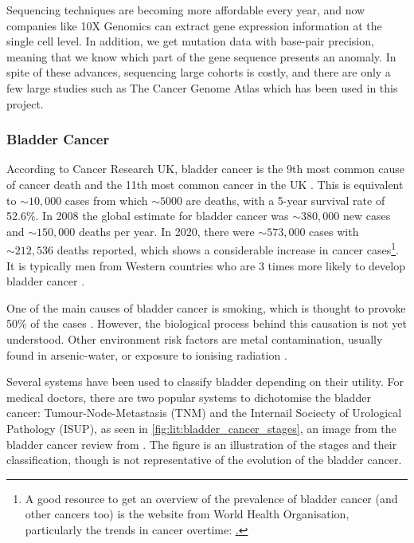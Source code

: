 Sequencing techniques are becoming more affordable every year, and now companies like 10X Genomics can extract gene expression information at the single cell level. In addition, we get mutation data with base-pair precision, meaning that we know which part of the gene sequence presents an anomaly. In spite of these advances, sequencing large cohorts is costly, and there are only a few large studies such as The Cancer Genome Atlas which has been used in this project.

\subsubsection{Bladder Cancer} \label{s:lit:bladder_cancer}

According to Cancer Research UK, bladder cancer is the 9th most common cause of cancer death and the 11th most common cancer in the UK \cite{Cancer_Research_UK2015-cf}. This is equivalent to $\sim10,000$ cases from which  $\sim5000$ are deaths, with a 5-year survival rate of 52.6\%. In 2008\cite{Ferlay2010-sx} the global estimate for bladder cancer was $\sim380,000$ new cases and $\sim150,000$ deaths per year. In 2020\cite{Sung2021-hn}, there were $\sim573,000$ cases with $\sim212,536$ deaths reported, which shows a considerable increase in cancer cases\footnote{A good resource to get an overview of the prevalence of bladder cancer (and other cancers too) is the website from World Health Organisation, particularly the trends in cancer overtime: \href{https://gco.iarc.fr/en}.}. It is typically men from Western countries who are 3 times more likely to develop bladder cancer \cite{Knowles2015-mu}. 

One of the main causes of bladder cancer is smoking, which is thought to provoke 50\% of the cases \citet{Knowles2015-mu}. However, the biological process behind this causation is not yet understood. Other environment risk factors are metal contamination, usually found in arsenic-water, or exposure to ionising radiation \citet{Knowles2015-mu}. 

Several systems have been used to classify bladder depending on their utility. For medical doctors, there are two popular systems to dichotomise the bladder cancer: Tumour-Node-Metastasis (TNM) and the Internail Sociecty of Urological Pathology (ISUP), as seen in \cref{fig:lit:bladder_cancer_stages}, an image from the bladder cancer review from \citet{Knowles2015-mu}. The figure is an illustration of the stages and their classification, though is not representative of the evolution of the bladder cancer.

